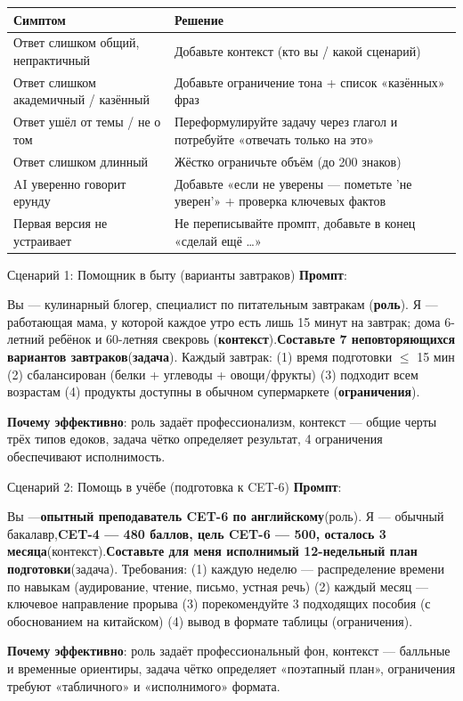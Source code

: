 \begin{center}
\begin{tabularx}{\linewidth}{|X|X|}
\hline
\textbf{Симптом} & \textbf{Решение} \tabularnewline
\hline
Ответ слишком общий, непрактичный & Добавьте контекст (кто вы / какой сценарий) \tabularnewline
Ответ слишком академичный / казённый & Добавьте ограничение тона + список «казённых» фраз \tabularnewline
Ответ ушёл от темы / не о том & Переформулируйте задачу через глагол и потребуйте «отвечать только на это» \tabularnewline
Ответ слишком длинный & Жёстко ограничьте объём (до 200 знаков) \tabularnewline
AI уверенно говорит ерунду & Добавьте «если не уверены — пометьте 'не уверен'» + проверка ключевых фактов \tabularnewline
Первая версия не устраивает & Не переписывайте промпт, добавьте в конец «сделай ещё …» \tabularnewline
\hline
\end{tabularx}
\end{center}


\begin{tcbinfo}{Сценарий 1: Помощник в быту (варианты завтраков)}
\textbf{Промпт}:

Вы — кулинарный блогер, специалист по питательным завтракам (\textbf{роль}). Я — работающая мама, у которой каждое утро есть лишь 15 минут на завтрак; дома 6-летний ребёнок и 60-летняя свекровь (\textbf{контекст}).\textbf{Составьте 7 неповторяющихся вариантов завтраков}(\textbf{задача}). Каждый завтрак: (1) время подготовки $\leq$ 15 мин (2) сбалансирован (белки + углеводы + овощи/фрукты) (3) подходит всем возрастам (4) продукты доступны в обычном супермаркете (\textbf{ограничения}).

\textbf{Почему эффективно}: роль задаёт профессионализм, контекст — общие черты трёх типов едоков, задача чётко определяет результат, 4 ограничения обеспечивают исполнимость.

\end{tcbinfo}

\begin{tcbinfo}{Сценарий 2: Помощь в учёбе (подготовка к CET-6)}
\textbf{Промпт}:

Вы —\textbf{опытный преподаватель CET-6 по английскому}(роль). Я — обычный бакалавр,\textbf{CET-4 — 480 баллов, цель CET-6 — 500, осталось 3 месяца}(контекст).\textbf{Составьте для меня исполнимый 12-недельный план подготовки}(задача). Требования: (1) каждую неделю — распределение времени по навыкам (аудирование, чтение, письмо, устная речь) (2) каждый месяц — ключевое направление прорыва (3) порекомендуйте 3 подходящих пособия (с обоснованием на китайском) (4) вывод в формате таблицы (ограничения).

\textbf{Почему эффективно}: роль задаёт профессиональный фон, контекст — балльные и временные ориентиры, задача чётко определяет «поэтапный план», ограничения требуют «табличного» и «исполнимого» формата.

\end{tcbinfo}

